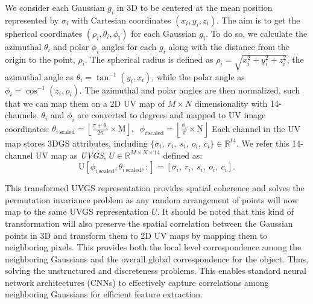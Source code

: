 We consider each Gaussian $g_i$ in 3D to be centered at the mean position represented by $\sigma_i$ with Cartesian coordinates $(x_i,y_i,z_i)$. 
The aim is to get the spherical coordinates $(\rho_i,\theta_i,\phi_i)$ for each Gaussian $g_i$. To do so, we calculate the azimuthal $\theta_i$ and polar $\phi_i$ angles for each $g_i$ along with the distance from the origin to the point, $\rho_i$. The spherical radius is defined as \(\rho_i = \sqrt{x_i^2 + y_i^2 + z_i^2}\), the azimuthal angle as \( \theta_i = \tan^{-1}(y_i, x_i)\), while the  polar angle as \( \phi_i = \cos^{-1}(z_i, \rho_i) \). 
The azimuthal and polar angles are then normalized, such that we can map them on a 2D UV map of $M \times N$ dimensionality with 14-channels. 
\(\theta_i\) and \(\phi_i\) are converted to degrees and mapped to UV image coordinates: \(\theta_{i~\text{scaled}} = \left\lfloor \frac{\pi + \theta_{i}}{2\pi} \times \text{M} \right\rfloor, \; \; \phi_{i~\text{scaled}} = \left\lfloor \frac{\phi_i}{\pi} \times \text{N} \right\rfloor\)
Each channel in the UV map stores 3DGS attributes, including $\{ \sigma_i, ~r_i, ~s_i, ~o_i, ~c_i \} \in \mathbb{R}^{14}$. We refer this 14-channel UV map as \emph{UVGS}, $U \in \mathbb{R}^{M\times N \times14}$ defined as:
\begin{equation}
    \text{U}[\phi_{i~\text{scaled}}, \theta_{i~\text{scaled}}, :] = [ \sigma_i, ~r_i, ~s_i, ~o_i, ~c_i ]. %
\end{equation}

This transformed UVGS representation provides spatial coherence and solves the permutation invariance problem as any random arrangement of points will now map to the same UVGS representation $U$.
It should be noted that this kind of transformation will also preserve the spatial correlation between the Gaussian points in 3D and transform them to 2D UV maps by mapping them to neighboring pixels. 
This provides both the local level correspondence among the neighboring Gaussians and the overall global correspondence for the object. 
Thus, solving the unstructured and discreteness problems.
This enables standard neural network architectures (\eg CNNs) to effectively capture correlations among neighboring Gaussians for efficient feature extraction. 

